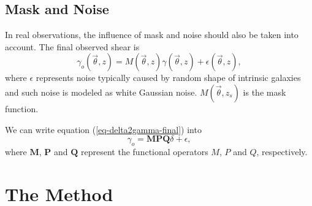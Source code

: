 \documentclass[twocolumn]{aastex62}
\begin{document}
\subsection{Mask and Noise}
In real observations, the influence of mask and noise should also be taken into account. The final observed shear is
\begin{equation}\label{eq-delta2gamma-final}
\gamma_o(\vec{\theta},z)=M(\vec{\theta},z) \gamma(\vec{\theta},z) + \epsilon(\vec{\theta},z),
\end{equation}
where $\epsilon$ represents noise typically caused by random shape of intrinsic galaxies and such noise is modeled as white Gaussian noise. $M(\vec{\theta},z_s)$ is the mask function.

We can write equation (\ref{eq-delta2gamma-final}) into
\begin{equation}\label{eq-delta2gamma-operator-final}
\gamma_o =\mathbf{M}  \mathbf{P} \mathbf{Q} \delta + \epsilon,
\end{equation}
where $\mathbf{M}$,  $\mathbf{P}$ and $\mathbf{Q}$ represent the functional operators $M$, $P$ and $Q$, respectively.

\section{The Method}
\label{sec:kappaMap}
\end{document}
